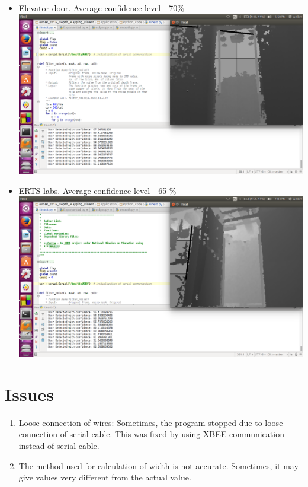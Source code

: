 \documentclass{report}
\begin{document}
\begin{itemize}
 \item Elevator door. Average confidence level - 70\% \\
 \includegraphics[width = 15cm]{lift.png} \\
 \item ERTS labs. Average confidence level - 65 \% \\
 \includegraphics[width = 15cm]{erts_lab_confidence.png} \\

\end{itemize}


\chapter{Issues}
\begin{enumerate}
 \item Loose connection of wires: Sometimes, the program stopped due to loose connection of serial cable. This was fixed by using
 XBEE communication instead of serial cable.
 \item The method used for calculation of width is not accurate. Sometimes, it may give values very different from the actual value.
\end{enumerate}
\end{document}
